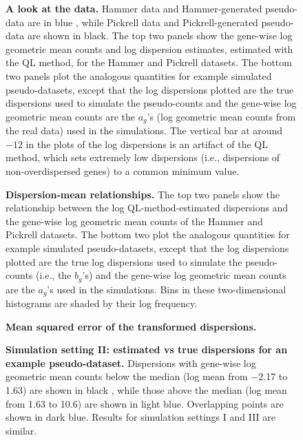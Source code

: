 \documentclass[10pt]{article}
\begin{document}
\begin{figure}[!ht]
   \centering
   \caption{{\bf A look at the data.} Hammer data and Hammer-generated pseudo-data are in blue %
   , while Pickrell data and Pickrell-generated pseudo-data are shown in black. %
    The top two panels show the gene-wise log geometric mean counts and log dispersion estimates, estimated with the QL method, for the Hammer and Pickrell datasets. The bottom two panels plot the analogous quantities for example simulated pseudo-datasets, except that the log dispersions plotted are the true dispersions used to simulate the pseudo-counts and the gene-wise log geometric mean counts are the $a_g$'s (log geometric mean counts from the real data) used in the simulations. The vertical bar at around $-12$ in the plots of the log dispersions is an artifact of the QL method, which sets  extremely low dispersions (i.e., dispersions of non-overdispersed genes) to a common minimum value.}
   \label{fig:hists}
\end{figure}

\begin{figure}[!ht]
   \centering
   \caption{{\bf Dispersion-mean relationships.} The top two panels show the relationship between the log QL-method-estimated dispersions and the gene-wise log geometric mean counts of the Hammer and Pickrell datasets. The bottom two plot the analogous quantities for example simulated pseudo-datasets, except that the log dispersions plotted are the true log dispersions used to simulate the pseudo-counts (i.e., the $b_g$'s) and the gene-wise log geometric mean counts are the $a_g$'s used in the simulations. Bins in these two-dimensional histograms are shaded by their log frequency.}
   \label{fig:meandispscatter}
\end{figure}

\begin{figure}[!ht] %
   \centering
   \caption{{\bf Mean squared error of the transformed dispersions.}}
   \label{fig:mse}
\end{figure}

\begin{figure}[!ht] %
   \centering
   \caption{{\bf  Simulation setting II: estimated vs true dispersions for an example pseudo-dataset.}  Dispersions with gene-wise log geometric mean counts below the median (log mean from $-$2.17 to 1.63) are shown in black %
   , while those above the median (log mean from 1.63 to 10.6) are shown in light blue. %
   Overlapping points are shown in dark blue. %
   Results for simulation settings I and III are similar. }
   \label{fig:pp2}
\end{figure}
\end{document}
